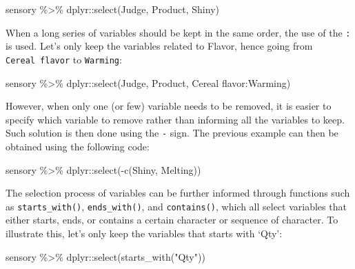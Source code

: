 \documentclass[
]{book}
\newenvironment{Shaded}{\begin{snugshade}}{\end{snugshade}}
\newcommand{\AttributeTok}[1]{\textcolor[rgb]{0.77,0.63,0.00}{#1}}
\newcommand{\FunctionTok}[1]{\textcolor[rgb]{0.00,0.00,0.00}{#1}}
\newcommand{\NormalTok}[1]{#1}
\newcommand{\SpecialCharTok}[1]{\textcolor[rgb]{0.00,0.00,0.00}{#1}}
\newcommand{\StringTok}[1]{\textcolor[rgb]{0.31,0.60,0.02}{#1}}
\begin{document}
\begin{Shaded}
\begin{Highlighting}[]
\NormalTok{sensory }\SpecialCharTok{\%\textgreater{}\%} 
\NormalTok{  dplyr}\SpecialCharTok{::}\FunctionTok{select}\NormalTok{(Judge, Product, Shiny)}
\end{Highlighting}
\end{Shaded}

When a long series of variables should be kept in the same order, the use of the \texttt{:} is used.
Let's only keep the variables related to Flavor, hence going from \texttt{Cereal\ flavor} to \texttt{Warming}:

\begin{Shaded}
\begin{Highlighting}[]
\NormalTok{sensory }\SpecialCharTok{\%\textgreater{}\%} 
\NormalTok{  dplyr}\SpecialCharTok{::}\FunctionTok{select}\NormalTok{(Judge, Product, }\StringTok{\textasciigrave{}}\AttributeTok{Cereal flavor}\StringTok{\textasciigrave{}}\SpecialCharTok{:}\NormalTok{Warming)}
\end{Highlighting}
\end{Shaded}

However, when only one (or few) variable needs to be removed, it is easier to specify which variable to remove rather than informing all the variables to keep. Such solution is then done using the \texttt{-} sign. The previous example can then be obtained using the following code:

\begin{Shaded}
\begin{Highlighting}[]
\NormalTok{sensory }\SpecialCharTok{\%\textgreater{}\%} 
\NormalTok{  dplyr}\SpecialCharTok{::}\FunctionTok{select}\NormalTok{(}\SpecialCharTok{{-}}\FunctionTok{c}\NormalTok{(Shiny, Melting))}
\end{Highlighting}
\end{Shaded}

The selection process of variables can be further informed through functions such as \texttt{starts\_with()}, \texttt{ends\_with()}, and \texttt{contains()}, which all select variables that either starts, ends, or contains a certain character or sequence of character. To illustrate this, let's only keep the variables that starts with `Qty':

\begin{Shaded}
\begin{Highlighting}[]
\NormalTok{sensory }\SpecialCharTok{\%\textgreater{}\%} 
\NormalTok{  dplyr}\SpecialCharTok{::}\FunctionTok{select}\NormalTok{(}\FunctionTok{starts\_with}\NormalTok{(}\StringTok{"Qty"}\NormalTok{))}
\end{Highlighting}
\end{Shaded}
\end{document}
